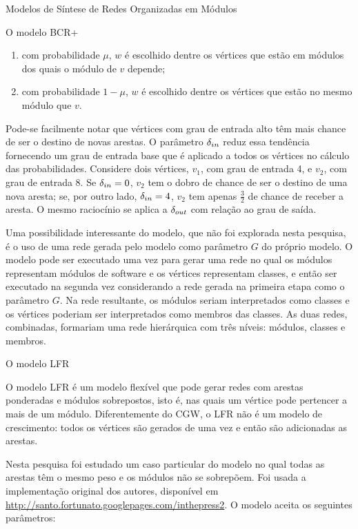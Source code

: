 \begin{section}{Modelos de Síntese de Redes Organizadas em Módulos}
\begin{subsection}{O modelo BCR+}
\begin{enumerate}
\begin{enumerate}
  \item com probabilidade $\mu$, $w$ é escolhido dentre os vértices que estão em módulos dos quais o módulo de $v$ depende;
  \item com probabilidade $1 - \mu$, $w$ é escolhido dentre os vértices que estão no mesmo módulo que $v$.
\end{enumerate}

\end{enumerate}

Pode-se facilmente notar que vértices com grau de entrada alto têm mais chance de ser o destino de novas arestas. O parâmetro $\delta_{in}$ reduz essa tendência fornecendo um grau de entrada base que é aplicado a todos os vértices no cálculo das probabilidades. Considere dois vértices, $v_1$, com grau de entrada 4, e $v_2$, com grau de entrada 8. Se $\delta_{in} = 0$, $v_2$ tem o dobro de chance de ser o destino de uma nova aresta; se, por outro lado, $\delta_{in} = 4$, $v_2$ tem apenas $\frac{3}{2}$ de chance de receber a aresta. O mesmo raciocínio se aplica a $\delta_{out}$ com relação ao grau de saída.


Uma possibilidade interessante do modelo, que não foi explorada nesta pesquisa, é o uso de uma rede gerada pelo modelo como parâmetro $G$ do próprio modelo. O modelo pode ser executado uma vez para gerar uma rede no qual os módulos representam módulos de software e os vértices representam classes, e então ser executado na segunda vez considerando a rede gerada na primeira etapa como o parâmetro $G$. Na rede resultante, os módulos seriam interpretados como classes e os vértices poderiam ser interpretados como membros das classes. As duas redes, combinadas, formariam uma rede hierárquica com três níveis: módulos, classes e membros.

\end{subsection}

\begin{subsection}{O modelo LFR}

O modelo LFR \cite{Lancichinetti2008,Lancichinetti2009} é um modelo flexível que pode gerar redes com arestas ponderadas e módulos sobrepostos, isto é, nas quais um vértice pode pertencer a mais de um módulo. Diferentemente do CGW, o LFR não é um modelo de crescimento: todos os vértices são gerados de uma vez e então são adicionadas as arestas.

Nesta pesquisa foi estudado um caso particular do modelo no qual todas as arestas têm o mesmo peso e os módulos não se sobrepõem. Foi usada a implementação original dos autores, disponível em  \url{http://santo.fortunato.googlepages.com/inthepress2}. O modelo aceita os seguintes parâmetros:


\end{subsection}
\end{section}

